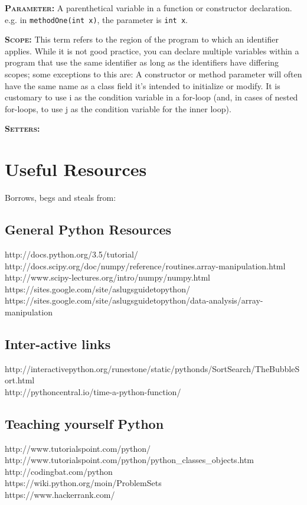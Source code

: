 \documentclass[11pt,a4paper]{article}
\begin{document}
\smallskip \smallskip
\noindent \textbf{\textsc{Parameter:}} A parenthetical variable in a
function or constructor declaration. e.g. in {\tt methodOne(int x)},
the parameter is {\tt int x}.

\smallskip \smallskip
\noindent \textbf{\textsc{Scope:}} This term refers to the region of
the program to which an identifier applies. While it is not good
practice, you can declare multiple variables within a program that use
the same identifier as long as the identifiers have differing scopes;
some exceptions to this are: A constructor or method parameter will
often have the same name as a class field it's intended to initialize
or modify.  It is customary to use i as the condition variable in a
for-loop (and, in cases of nested for-loops, to use j as the condition
variable for the inner loop).

\smallskip \smallskip
\noindent \textbf{\textsc{Setters:}}





\newpage
\section{Useful Resources}
Borrows, begs and steals from: \\

\subsection*{General Python Resources}
http://docs.python.org/3.5/tutorial/\\
http://docs.scipy.org/doc/numpy/reference/routines.array-manipulation.html\\
http://www.scipy-lectures.org/intro/numpy/numpy.html\\
https://sites.google.com/site/aslugsguidetopython/\\
https://sites.google.com/site/aslugsguidetopython/data-analysis/array-manipulation\\

\subsection*{Inter-active links}
http://interactivepython.org/runestone/static/pythonds/SortSearch/TheBubbleSort.html\\
http://pythoncentral.io/time-a-python-function/\\


\subsection*{Teaching yourself Python}
http://www.tutorialspoint.com/python/\\
http://www.tutorialspoint.com/python/python\_classes\_objects.htm\\
http://codingbat.com/python\\
https://wiki.python.org/moin/ProblemSets\\
https://www.hackerrank.com/\\
\end{document}
